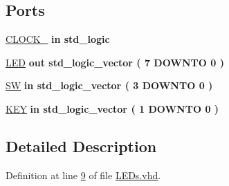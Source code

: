 \subsection*{Ports}
 \begin{DoxyCompactItemize}
\item 
\hyperlink{class_l_e_ds_a4b5e1e3eba67b2e61c77c9a719d8518c}{C\+L\+O\+C\+K\+\_}  {\bfseries {\bfseries \textcolor{keywordflow}{in}\textcolor{vhdlchar}{ }}} {\bfseries \textcolor{comment}{std\+\_\+logic}\textcolor{vhdlchar}{ }} 
\item 
\hyperlink{class_l_e_ds_a424944084857f6787a0ddb567d0b5240}{L\+E\+D}  {\bfseries {\bfseries \textcolor{keywordflow}{out}\textcolor{vhdlchar}{ }}} {\bfseries \textcolor{comment}{std\+\_\+logic\+\_\+vector}\textcolor{vhdlchar}{ }\textcolor{vhdlchar}{(}\textcolor{vhdlchar}{ }\textcolor{vhdlchar}{ } \textcolor{vhdldigit}{7} \textcolor{vhdlchar}{ }\textcolor{keywordflow}{D\+O\+W\+N\+T\+O}\textcolor{vhdlchar}{ }\textcolor{vhdlchar}{ } \textcolor{vhdldigit}{0} \textcolor{vhdlchar}{ }\textcolor{vhdlchar}{)}\textcolor{vhdlchar}{ }} 
\item 
\hyperlink{class_l_e_ds_a30974727c81621f672f7f9490463f9d3}{S\+W}  {\bfseries {\bfseries \textcolor{keywordflow}{in}\textcolor{vhdlchar}{ }}} {\bfseries \textcolor{comment}{std\+\_\+logic\+\_\+vector}\textcolor{vhdlchar}{ }\textcolor{vhdlchar}{(}\textcolor{vhdlchar}{ }\textcolor{vhdlchar}{ } \textcolor{vhdldigit}{3} \textcolor{vhdlchar}{ }\textcolor{keywordflow}{D\+O\+W\+N\+T\+O}\textcolor{vhdlchar}{ }\textcolor{vhdlchar}{ } \textcolor{vhdldigit}{0} \textcolor{vhdlchar}{ }\textcolor{vhdlchar}{)}\textcolor{vhdlchar}{ }} 
\item 
\hyperlink{class_l_e_ds_aa70bf9245705f33e4529eb81df3fbf94}{K\+E\+Y}  {\bfseries {\bfseries \textcolor{keywordflow}{in}\textcolor{vhdlchar}{ }}} {\bfseries \textcolor{comment}{std\+\_\+logic\+\_\+vector}\textcolor{vhdlchar}{ }\textcolor{vhdlchar}{(}\textcolor{vhdlchar}{ }\textcolor{vhdlchar}{ } \textcolor{vhdldigit}{1} \textcolor{vhdlchar}{ }\textcolor{keywordflow}{D\+O\+W\+N\+T\+O}\textcolor{vhdlchar}{ }\textcolor{vhdlchar}{ } \textcolor{vhdldigit}{0} \textcolor{vhdlchar}{ }\textcolor{vhdlchar}{)}\textcolor{vhdlchar}{ }} 
\end{DoxyCompactItemize}


\subsection{Detailed Description}


Definition at line \hyperlink{_l_e_ds_8vhd_source_l00009}{9} of file \hyperlink{_l_e_ds_8vhd_source}{L\+E\+Ds.\+vhd}.



